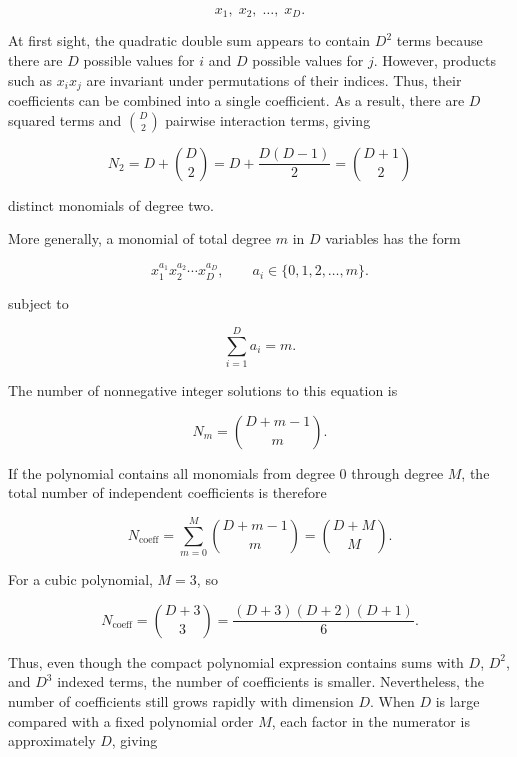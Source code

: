 \documentclass[10pt,twocolumn]{memoir}
\begin{document}
\begin{equation}
    x_1,\;x_2,\;\ldots,\;x_D.
\end{equation}

At first sight, the quadratic double sum appears to contain $D^2$ terms because there are $D$ possible values for $i$ and $D$ possible values for $j$. However, products such as $x_i x_j$ are invariant under permutations of their indices. Thus, their coefficients can be combined into a single coefficient. As a result, there are $D$ squared terms and $\binom{D}{2}$ pairwise interaction terms, giving

\begin{equation}
    N_2 = D+\binom{D}{2} = D + \frac{D(D-1)}{2} = \binom{D+1}{2}
\end{equation}

distinct monomials of degree two.

More generally, a monomial of total degree $m$ in $D$ variables has the form

\begin{equation}
    x_1^{a_1}x_2^{a_2}\cdots x_D^{a_D}, \qquad a_i \in \{0,1,2,\ldots,m\}.
\end{equation}

subject to

\begin{equation}
\sum_{i=1}^{D} a_i=m.
\end{equation}

The number of nonnegative integer solutions to this equation is

\begin{equation}
    N_m = \binom{D+m-1}{m}.
\end{equation}

If the polynomial contains all monomials from degree $0$ through degree $M$, the total number of independent coefficients is therefore

\begin{equation}
    N_{\mathrm{coeff}} = \sum_{m=0}^{M}\binom{D+m-1}{m} = \binom{D+M}{M}.
\end{equation}

For a cubic polynomial, $M=3$, so

\begin{equation}
    N_{\mathrm{coeff}} = \binom{D+3}{3} = \frac{(D+3)(D+2)(D+1)}{6}.
\end{equation}

Thus, even though the compact polynomial expression contains sums with $D$, $D^2$, and $D^3$ indexed terms, the number of  coefficients is smaller. Nevertheless, the number of coefficients still grows rapidly with dimension $D$. When $D$ is large compared with a fixed polynomial order $M$, each factor in the numerator is approximately $D$, giving
\end{document}
